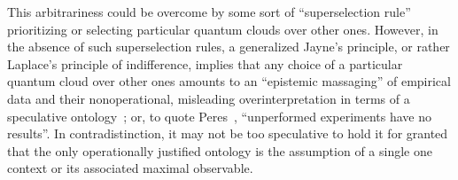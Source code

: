 This arbitrariness could be overcome by some sort of ``superselection rule''
prioritizing or selecting particular quantum clouds over other ones.
However, in the absence of such superselection rules, a generalized Jayne's principle, or rather Laplace's principle of indifference,
implies that any choice of a particular quantum cloud over other ones
amounts to an ``epistemic massaging'' of empirical data and their nonoperational,
misleading overinterpretation in terms of a speculative ontology~\cite{berkeley,stace,Goldschmidt2017-idealism};
or, to quote Peres~\cite{peres222}, {``unperformed experiments have no results''.}
In contradistinction, it may not be too speculative to hold it for granted that the only operationally
justified ontology is the assumption of a single one context or its associated maximal observable.%









